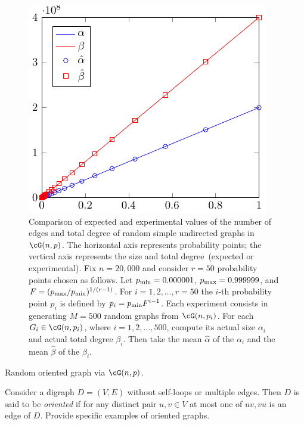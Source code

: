 \begin{figure}[!htbp]
\centering
\includegraphics{image/random-graphs/Gnp-simulation}
\caption{Comparison of expected and experimental values of the number
  of edges and total degree of random simple undirected graphs in
  $\cG(n,p)$. The horizontal axis represents probability points; the
  vertical axis represents the size and total degree~(expected or
  experimental). Fix $n = 20,000$ and consider $r = 50$ probability
  points chosen as follows. Let $p_{\rm min} = 0.000001$,
  $p_{\rm max} = 0.999999$, and
  $F = (p_{\rm max} / p_{\rm min})^{1 / (r-1)}$. For
  $i = 1, 2, \dots, r=50$ the $i$-th probability point $p_i$ is defined
  by $p_i = p_{\rm min} F^{i-1}$. Each experiment consists in
  generating $M = 500$ random graphs from $\cG(n, p_i)$. For each
  $G_i \in \cG(n, p_i)$, where $i = 1, 2, \dots, 500$, compute its
  actual size $\alpha_i$ and actual total degree $\beta_i$. Then take
  the mean $\hat{\alpha}$ of the $\alpha_i$ and the mean $\hat{\beta}$
  of the $\beta_i$.}
\label{fig:random_graphs:Gnp_expected_and_experimental_values}
\end{figure}

\begin{algorithm}[!htbp]

\caption{Random oriented graph via $\cG(n,p)$.}
\label{alg:random_graphs:random_oriented_graph_Gnp}
\end{algorithm}

\begin{example}
\label{eg:random_graphs:random_oriented_graph}
Consider a digraph $D = (V,E)$ without self-loops or multiple
edges. Then $D$ is said to be \emph{oriented} if
for any distinct pair $u,v \in V$ at most one of $uv, vu$ is an edge
of $D$. Provide specific examples of oriented graphs.
\end{example}

